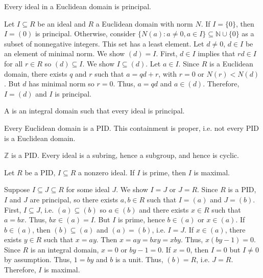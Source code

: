 \documentclass{mathnotes}
\begin{document}
\begin{prop}
  Every ideal in a Euclidean domain is principal.
\end{prop}

\begin{pf}
  Let $I\subseteq R$ be an ideal and $R$ a Euclidean domain with norm $N$. If
  $I=\{0\}$, then $I=(0)$ is principal. Otherwise, consider $\{N(a):a\ne0,a\in
  I\}\subseteq\mathbb{N}\cup\{0\}$ as a subset of nonnegative integers. This
  set has a least element. Let $d\ne0$, $d\in I$ be an element of minimal norm.
  We show $(d)=I$. First, $d\in I$ implies that $rd\in I$ for all $r\in R$ so
  $(d)\subseteq I$. We show $I\subseteq(d)$. Let $a\in I$. Since $R$ is a
  Euclidean domain, there exists $q$ and $r$ such that $a=qd+r$, with $r=0$ or
  $N(r)<N(d)$. But $d$ has minimal norm so $r=0$. Thus, $a=qd$ and $a\in(d)$.
  Therefore, $I=(d)$ and $I$ is principal.
\end{pf}

\begin{defi}
  A  is an integral domain such that every ideal
  is principal.
\end{defi}

\begin{prop}
  Every Euclidean domain is a PID. This containment is proper, i.e. not every
  PID is a Euclidean domain.
\end{prop}

\begin{ex}
  $\mathbb{Z}$ is a PID. Every ideal is a subring, hence a subgroup, and hence
  is cyclic.
\end{ex}

\begin{prop}
  Let $R$ be a PID, $I\subseteq R$ a nonzero ideal. If $I$ is prime, then $I$
  is maximal.
\end{prop}

\begin{pf}
  Suppose $I\subseteq J\subseteq R$ for some ideal $J$. We show $I=J$ or $J=R$.
  Since $R$ is a PID, $I$ and $J$ are principal, so there exists $a,b\in R$
  such that $I=(a)$ and $J=(b)$. First, $I\subseteq J$, i.e. $(a)\subseteq(b)$
  so $a\in(b)$ and there exists $x\in R$ such that $a=bx$. Thus, $bx\in(a)=I$.
  But $I$ is prime, hence $b\in(a)$ or $x\in(a)$. If $b\in(a)$, then
  $(b)\subseteq(a)$ and $(a)=(b)$, i.e. $I=J$. If $x\in(a)$, there exists $y\in
  R$ such that $x=ay$. Then $x=ay=bxy=xby$. Thus, $x(by-1)=0$. Since $R$ is an
  integral domain, $x=0$ or $by-1=0$. If $x=0$, then $I=0$ but $I\ne0$ by
  assumption. Thus, $1=by$ and $b$ is a unit. Thus, $(b)=R$, i.e. $J=R$.
  Therefore, $I$ is maximal.
\end{pf}
\end{document}
